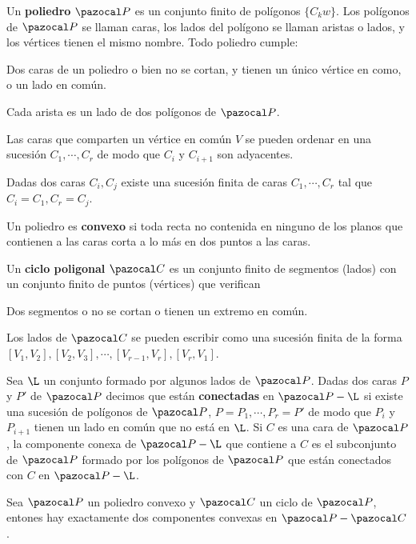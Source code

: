  Un \textbf{poliedro} $\PP$ es un conjunto finito de polígonos $\{C_kw\}$. Los polígonos de $\PP$ se llaman caras, los lados del polígono se llaman aristas o lados, y los vértices tienen el mismo nombre. Todo poliedro cumple:
\begin{itemizex}
	\item Dos caras de un poliedro o bien no se cortan, y tienen un único vértice en como, o un lado en común.
	\item Cada arista es un lado de dos polígonos de $\PP$.
	\item Las caras que comparten un vértice en común $V$ se pueden ordenar en una sucesión $C_1, \cdots, C_r$ de modo que $C_i$ y $C_{i+1}$ son adyacentes. 
	\item Dadas dos caras $C_i, C_j$ existe una sucesión finita de caras $C_1, \cdots, C_r$ tal que $C_i = C_1, C_r = C_j$.
\end{itemizex}

 Un poliedro es \textbf{convexo} si toda recta no contenida en ninguno de los planos que contienen a las caras corta a lo más en dos puntos a las caras.

 Un \textbf{ciclo poligonal} $\C$ es un conjunto finito de segmentos (lados) con un conjunto finito de puntos (vértices) que verifican
\begin{itemizex}
	\item Dos segmentos o no se cortan o tienen un extremo en común.
	\item Los lados de $\C$ se pueden escribir como una sucesión finita de la forma $[V_1,V_2], [V_2,V_3],\cdots, [V_{r-1},V_r],[V_r,V_1]$.
\end{itemizex}

 Sea $\L$ un conjunto formado por algunos lados de $\PP$. Dadas dos caras $P$ y $P'$ de $\PP$ decimos que están \textbf{conectadas} en $\PP - \L$ si existe una sucesión de polígonos de $\PP$, $P = P_1, \cdots, P_r = P'$ de modo que $P_i$ y $P_{i+1}$ tienen un lado en común que no está en $\L$. Si $C$ es una cara de $\PP$, la componente conexa de $\PP - \L$ que contiene a $C$ es el subconjunto de $\PP$ formado por los polígonos de $\PP$ que están conectados con $C$ en $\PP-\L$.

 Sea $\PP$ un poliedro convexo y $\C$ un ciclo de $\PP$, entones hay exactamente dos componentes convexas en $\PP-\C$.

